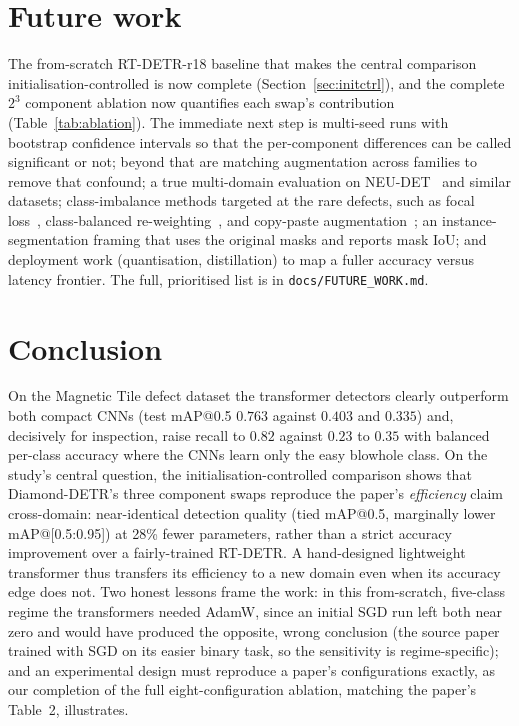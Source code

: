 \documentclass[11pt,a4paper]{article}
\begin{document}
\section{Future work}\label{sec:future}
The from-scratch RT-DETR-r18 baseline that makes the central comparison initialisation-controlled is
now complete (Section~\ref{sec:initctrl}), and the complete $2^3$ component ablation now quantifies each
swap's contribution (Table~\ref{tab:ablation}). The immediate next step is multi-seed runs with bootstrap
confidence intervals so that the per-component differences can be called significant or not; beyond that
are matching augmentation across families to remove that confound; a true
multi-domain evaluation on NEU-DET~\cite{neu} and similar datasets; class-imbalance methods targeted
at the rare defects, such as focal loss~\cite{focal}, class-balanced re-weighting~\cite{cb}, and
copy-paste augmentation~\cite{copypaste}; an instance-segmentation framing that uses the original
masks and reports mask IoU; and deployment work (quantisation, distillation) to map a fuller
accuracy versus latency frontier. The full, prioritised list is in \texttt{docs/FUTURE\_WORK.md}.

\section{Conclusion}
On the Magnetic Tile defect dataset the transformer detectors clearly outperform both compact CNNs
(test mAP@0.5 $0.763$ against $0.403$ and $0.335$) and, decisively for inspection, raise recall to
$0.82$ against $0.23$ to $0.35$ with balanced per-class accuracy where the CNNs learn only the easy
blowhole class. On the study's central question, the initialisation-controlled comparison shows that
Diamond-DETR's three component swaps reproduce the paper's \emph{efficiency} claim cross-domain:
near-identical detection quality (tied mAP@0.5, marginally lower mAP@[0.5:0.95]) at 28\% fewer
parameters, rather than a strict accuracy improvement over a fairly-trained RT-DETR. A hand-designed
lightweight transformer thus transfers its efficiency to a new domain even when its accuracy edge
does not. Two honest lessons frame the work: in this from-scratch, five-class regime the transformers
needed AdamW, since an initial SGD run left both near zero and would have produced the opposite, wrong
conclusion (the source paper trained with SGD on its easier binary task, so the sensitivity is
regime-specific); and an experimental design must reproduce a paper's configurations exactly, as our
completion of the full eight-configuration ablation, matching the paper's Table~2, illustrates.
\end{document}
